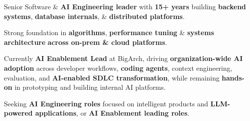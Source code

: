\begin{cventries}
  \cventry
    {}
    {}
    {}
    {}
    {
      \begin{cvitems}
        \item {Senior Software \& \textbf{AI Engineering leader} with \textbf{15+ years} building \textbf{backend systems}, \textbf{database internals}, \& \textbf{distributed platforms}.}
        \item {Strong foundation in \textbf{algorithms}, \textbf{performance tuning} \& \textbf{systems architecture} \textbf{across on-prem \& cloud platforms}.}
        \item {Currently \textbf{AI Enablement Lead} at BigArch, driving \textbf{organization-wide AI adoption} across developer workflows, \textbf{coding agents}, context engineering, evaluation, and \textbf{AI-enabled SDLC transformation}, while remaining \textbf{hands-on} in prototyping and building internal AI platforms.}
        \item {Seeking \textbf{AI Engineering roles} focused on intelligent products and \textbf{LLM-powered applications}, or \textbf{AI Enablement leading roles}.}
      \end{cvitems}
    }
\end{cventries}